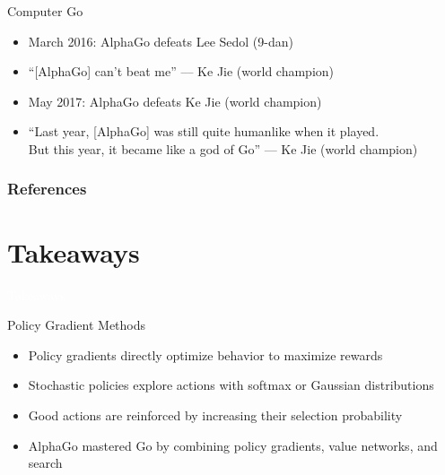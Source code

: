 \documentclass[11pt,table]{beamer}
\begin{document}
\begin{frame}{Computer Go}



\begin{itemize}
    \item March 2016: AlphaGo defeats Lee Sedol (9-dan)
    \item ``[AlphaGo] can't beat me'' --- Ke Jie (world champion)
\end{itemize}

\vspace{0.3cm}

\begin{itemize}
    \item May 2017: AlphaGo defeats Ke Jie (world champion)
\end{itemize}

\vspace{0.2cm}

\begin{itemize}
    \item ``Last year, [AlphaGo] was still quite humanlike when it played.\\
    But this year, it became like a god of Go'' --- Ke Jie (world champion)
\end{itemize}


\end{frame}



\begin{frame}[t,allowframebreaks
]\nocite{*}
\frametitle{References}
\small

\end{frame}
\section{Takeaways}
{
\begin{frame}
\centering
\Huge
\textcolor{white}{Takeaways}
\thispagestyle{empty}
\end{frame}
}

\begin{frame}{Policy Gradient Methods}
\begin{itemize}
    \item Policy gradients directly optimize behavior to maximize rewards
    \item Stochastic policies explore actions with softmax or Gaussian distributions
    \item Good actions are reinforced by increasing their selection probability
    \item AlphaGo mastered Go by combining policy gradients, value networks, and search
\end{itemize}
\end{frame}
\end{document}

